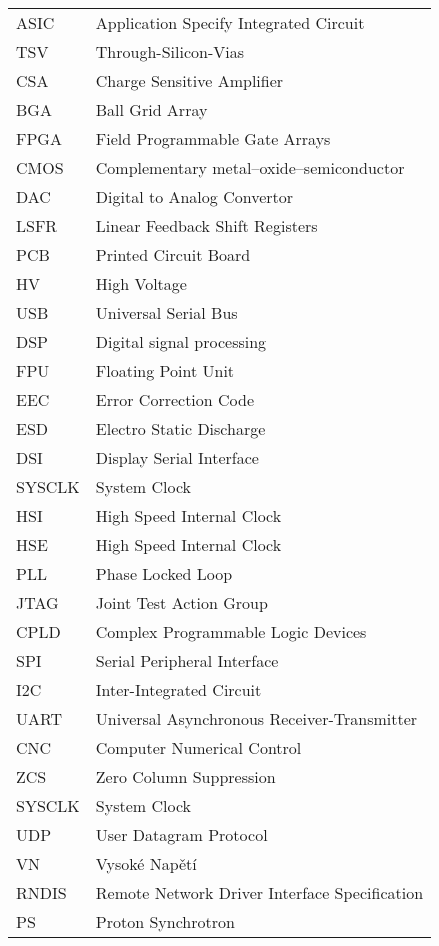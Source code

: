 \let\cleardoublepage\clearpage
{}
\begin{tabular}{ l  l }
    ASIC & Application Specify Integrated Circuit \\
	TSV	 & Through-Silicon-Vias \\
	CSA & Charge Sensitive Amplifier \\
	BGA & Ball Grid Array \\
	FPGA & Field Programmable Gate Arrays \\
	CMOS & Complementary metal–oxide–semiconductor \\
	DAC & Digital to Analog Convertor \\
	LSFR & Linear Feedback Shift Registers \\
	PCB & Printed Circuit Board \\
	HV & High Voltage \\
	USB & Universal Serial Bus \\
	DSP & Digital signal processing \\
	FPU & Floating Point Unit \\
	EEC & Error Correction Code \\
	ESD & Electro Static Discharge \\
	DSI & Display Serial Interface \\
	SYSCLK & System Clock \\
	HSI & High Speed Internal Clock \\
	HSE & High Speed Internal Clock \\
	PLL & Phase Locked Loop \\
	JTAG & Joint Test Action Group \\
	CPLD & Complex Programmable Logic Devices \\
	SPI & Serial Peripheral Interface \\
	I2C & Inter-Integrated Circuit \\
	UART & Universal Asynchronous Receiver-Transmitter \\
	CNC & Computer Numerical Control \\
	ZCS & Zero Column Suppression \\
	SYSCLK & System Clock \\
	UDP & User Datagram Protocol \\
	VN & Vysoké Napětí \\
	RNDIS & Remote Network Driver Interface Specification \\
	PS & Proton Synchrotron \\
\end{tabular}

